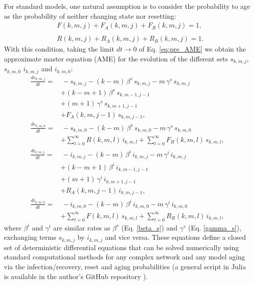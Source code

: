     For standard models, one natural assumption is to consider the probability to age as the probability of neither changing state nor resetting:
    \begin{align} \label{cond_1}
    &  F (k,m,j) + F_{A}(k,m,j) + F_{R}(k,m,j) = 1, \nonumber\\
    \\
    &  R (k,m,j) + R_{A}(k,m,j) + R_{R}(k,m,j) = 1. \nonumber
    \end{align}
    With this condition, taking the limit $dt \to 0$ of Eq. \eqref{eq:pre_AME} we obtain the approximate master equation (AME) for the evolution of the different sets $s_{k,m,j}$, $s_{k,m,0}$ $i_{k,m,j}$ and $i_{k,m,0}$:
    \begin{align}
    \label{eq:AME}
        \frac{d s_{k,m,j}}{dt} = & \, - s_{k,m,j} - (k - m)\, \beta^s\,  s_{k,m,j} - m \, \gamma^s\, s_{k,m,j} \nonumber \\
        & + (k-m+1)\, \beta^s \,   s_{k,m-1,j-1} \nonumber\\
        & + (m+1)\, \gamma^s \,  s_{k,m+1,j-1}\nonumber\\
        & + F_{A}(k,m,j-1)\,  s_{k,m,j-1},  \nonumber\\
        \frac{d s_{k,m,0}}{dt}  = & \, - s_{k,m,0} - (k - m) \, \beta^s\,  s_{k,m,0} - m\, \gamma^s \,  s_{k,m,0} \nonumber \\
        & + \sum_{l = 0}^{\infty} R (k,m,l)\,  i_{k,m,l} + \sum_{l = 0}^{\infty} F_{R}(k,m,l)\, s_{k,m,l}, \nonumber \\
         \frac{d i_{k,m,j}}{dt}  = & \, - i_{k,m,j} - (k - m)\, \beta^i\,  i_{k,m,j} - m\, \gamma^i \,   i_{k,m,j} \nonumber\\
        & + (k-m+1)\, \beta^i\,    i_{k,m-1,j-1} \nonumber\\
        & + (m+1)\, \gamma^i \,   i_{k,m+1,j-1} \\
        & + R_{A}(k,m,j-1) \, i_{k,m,j-1},  \nonumber\\
         \frac{d i_{k,m,0}}{dt}  = & \,  - i_{k,m,0} - (k - m) \, \beta^i\,  i_{k,m,0} - m\,  \gamma^i \,  i_{k,m,0} \nonumber\\
        & + \sum_{l = 0}^{\infty} F(k,m,l) \, s_{k,m,l} + \sum_{l = 0}^{\infty} R_{R}(k,m,l) \, i_{k,m,l}, \nonumber
    \end{align}
    where $\beta^i$ and $\gamma^i$ are similar rates as $\beta^s$ (Eq. \eqref{beta_s}) and $\gamma^s$ (Eq. \eqref{gamma_s}), exchanging terms $s_{k,m,j}$ by $i_{k,m,j}$ and vice versa. These equations define a closed set of deterministic differential equations that can be solved numerically using standard computational methods for any complex network and any model aging via the infection/recovery, reset and aging probabilities (a general script in Julia is available in the author's GitHub repository \cite{link_git}).
    
